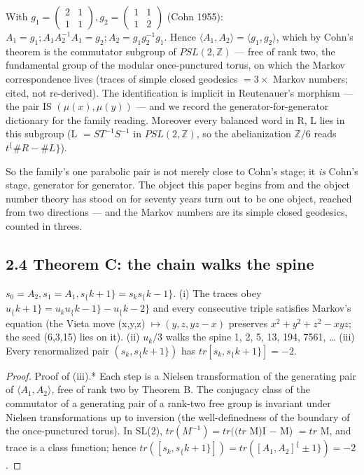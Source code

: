 \documentclass[11pt]{article}
\theoremstyle{plain}
\theoremstyle{definition}
\theoremstyle{remark}
\begin{document}
With \(g_{1} = \left(\begin{smallmatrix}2 & 1\\1 & 1\end{smallmatrix}\right), g_{2} = \left(\begin{smallmatrix}1 & 1\\1 & 2\end{smallmatrix}\right)\) (Cohn 1955): \(A_{1} = g_{1}; A_{1}A_{2}^{-1}A_{1} = g_{2}; A_{2} = g_{1}g_{2}^{-1}g_{1}\). Hence \(\langle A_{1},A_{2}\rangle  = \langle g_{1},g_{2}\rangle \), which by Cohn's theorem is the commutator subgroup of \(PSL(2,\mathbb{Z})\) — free of rank two, the fundamental group of the modular once-punctured torus, on which the Markov correspondence lives (traces of simple closed geodesics \(= 3 \times \) Markov numbers; cited, not re-derived). The identification is implicit in Reutenauer's morphism — the pair IS \((\mu (x), \mu (y))\) — and we record the generator-for-generator dictionary for the family reading. Moreover every balanced word in R, L lies in this subgroup (L \(= ST^{-1}S^{-1}\) in \(PSL(2,\mathbb{Z})\), so the abelianization \(\mathbb{Z}/6\) reads \(t^\{\#R-\#L\}\)). 

So the family's one parabolic pair is not merely close to Cohn's stage; it \emph{is} Cohn's stage, generator for generator. The object this paper begins from and the object number theory has stood on for seventy years turn out to be one object, reached from two directions — and the Markov numbers are its simple closed geodesics, counted in threes.

\subsection{2.4 Theorem C: the chain walks the spine}

\(s_{0} = A_{2}, s_{1} = A_{1}, s_\{k+1\} = s_{k} s_\{k-1\}\). (i) The traces obey \(u_\{k+1\} = u_{k} u_\{k-1\} - u_\{k-2\}\) and every consecutive triple satisfies Markov's equation (the Vieta move (x,y,z) \(\mapsto  (y,z,yz-x)\) preserves \(x^{2}+y^{2}+z^{2}-xyz\); the seed (6,3,15) lies on it). (ii) \(u_{k}/3\) walks the spine 1, 2, 5, 13, 194, 7561, … (iii) Every renormalized pair \((s_{k}, s_\{k+1\})\) has \(tr[s_{k}, s_\{k+1\}] = -2\).

\begin{proof}Proof of (iii).* Each step is a Nielsen transformation of the generating pair of \(\langle A_{1},A_{2}\rangle \), free of rank two by Theorem B. The conjugacy class of the commutator of a generating pair of a rank-two free group is invariant under Nielsen transformations up to inversion (the well-definedness of the boundary of the once-punctured torus). In SL(2), \(tr(M^{-1}) = tr((tr\) M)I \(-\) M) \(= tr\) M, and trace is a class function; hence \(tr([s_{k}, s_\{k+1\}]) = tr([A_{1},A_{2}]^\{\pm 1\}) = -2\). \end{proof}
\end{document}
